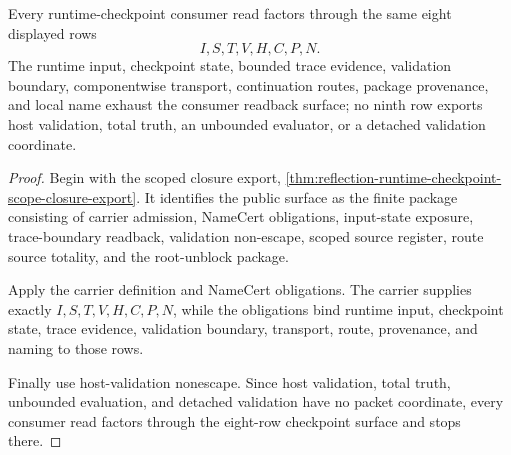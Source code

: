 \begin{theorem}
\label{thm:reflection-runtime-checkpoint-runtime-readback-exhaustion}
Every runtime-checkpoint consumer read factors through the same eight displayed rows
$$
I,S,T,V,H,C,P,N.
$$
The runtime input, checkpoint state, bounded trace evidence, validation boundary, componentwise transport, continuation routes, package provenance, and local name exhaust the consumer readback surface; no ninth row exports host validation, total truth, an unbounded evaluator, or a detached validation coordinate.
\end{theorem}
\begin{proof}
Begin with the scoped closure export, \autoref{thm:reflection-runtime-checkpoint-scope-closure-export}. It identifies the public surface as the finite package consisting of carrier admission, NameCert obligations, input-state exposure, trace-boundary readback, validation non-escape, scoped source register, route source totality, and the root-unblock package.

Apply the carrier definition and NameCert obligations. The carrier supplies exactly $I,S,T,V,H,C,P,N$, while the obligations bind runtime input, checkpoint state, trace evidence, validation boundary, transport, route, provenance, and naming to those rows.

Finally use host-validation nonescape. Since host validation, total truth, unbounded evaluation, and detached validation have no packet coordinate, every consumer read factors through the eight-row checkpoint surface and stops there.
\end{proof}

